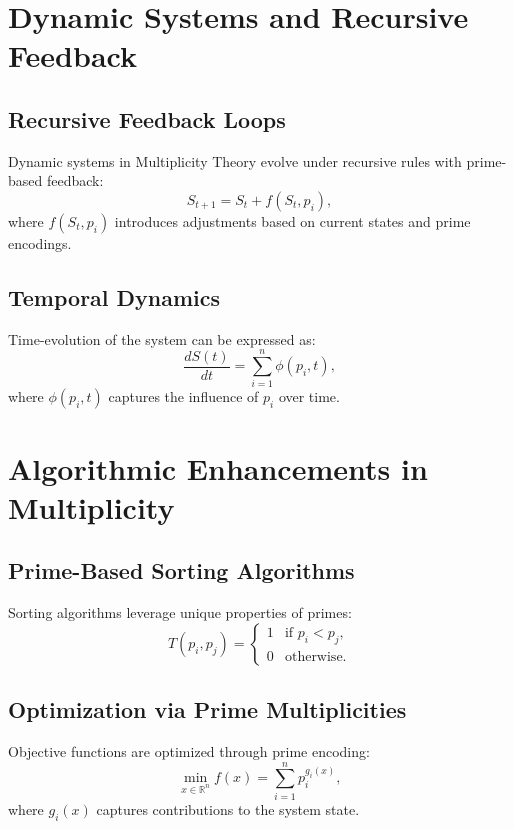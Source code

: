 \documentclass{article}
\theoremstyle{plain}
\begin{document}
\section{Dynamic Systems and Recursive Feedback}

\subsection{Recursive Feedback Loops}
Dynamic systems in Multiplicity Theory evolve under recursive rules with prime-based feedback:
\begin{equation}
    S_{t+1} = S_t + f(S_t, p_i),
\end{equation}
where \(f(S_t, p_i)\) introduces adjustments based on current states and prime encodings.

\subsection{Temporal Dynamics}
Time-evolution of the system can be expressed as:
\begin{equation}
    \frac{dS(t)}{dt} = \sum_{i=1}^n \phi(p_i, t),
\end{equation}
where \(\phi(p_i, t)\) captures the influence of \(p_i\) over time.

\section{Algorithmic Enhancements in Multiplicity}

\subsection{Prime-Based Sorting Algorithms}
Sorting algorithms leverage unique properties of primes:
\begin{equation}
    T(p_i, p_j) = 
    \begin{cases} 
    1 & \text{if } p_i < p_j, \\
    0 & \text{otherwise.}
    \end{cases}
\end{equation}

\subsection{Optimization via Prime Multiplicities}
Objective functions are optimized through prime encoding:
\begin{equation}
    \min_{x \in \mathbb{R}^n} f(x) = \sum_{i=1}^n p_i^{g_i(x)},
\end{equation}
where \(g_i(x)\) captures contributions to the system state.
\end{document}
